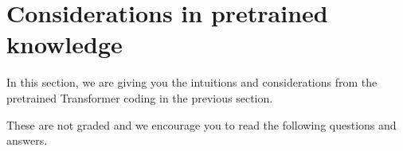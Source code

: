 \graphicspath{ {images/} }






\lstset{basicstyle=\ttfamily,columns=flexible,numbers=none}

\section{Considerations in pretrained knowledge}

In this section, we are giving you the intuitions and considerations from the pretrained Transformer coding in the previous section.

These are not graded and we encourage you to read the following questions and answers.

